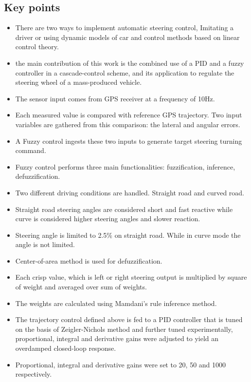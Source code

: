 \subsection*{Key points}
\begin{itemize}
	\item There are two ways to implement automatic steering control, Imitating a driver or using dynamic models of car and control methods based on linear control theory.
	\item  the main contribution
	of this work is the combined use of a PID and a fuzzy controller
	in a cascade-control scheme, and its application to regulate the
	steering wheel of a mass-produced vehicle.
	\item The sensor input comes from GPS receiver at a frequency of 10Hz.
	\item Each measured value is compared with reference GPS trajectory. Two input variables are gathered from this comparison: the lateral and angular errors.
	\item A Fuzzy control ingests these two inputs to generate target steering turning command.
	\item Fuzzy control performs three main functionalities: fuzzification, inference, defuzzification. 
	\item Two different driving conditions are handled. Straight road and curved road.
	\item Straight road steering angles are considered short and fast reactive while curve is considered higher steering angles and slower reaction.
	\item Steering angle is limited to 2.5\% on straight road. While in curve mode the angle is not limited.
	\item Center-of-area method is used for defuzzification.
	\item Each crisp value, which is left or right steering output is multiplied by square of weight and averaged over sum of weights.
	\item The weights are calculated using Mamdani's rule inference method.
	\item The trajectory control defined above is fed to a PID controller that is tuned on the basis of Zeigler-Nichols method and further tuned experimentally, proportional, integral and derivative gains were adjusted to yield an overdamped closed-loop response.
	\item Proportional, integral and derivative gains were set to 20, 50 and 1000 respectively.	
\end{itemize}

